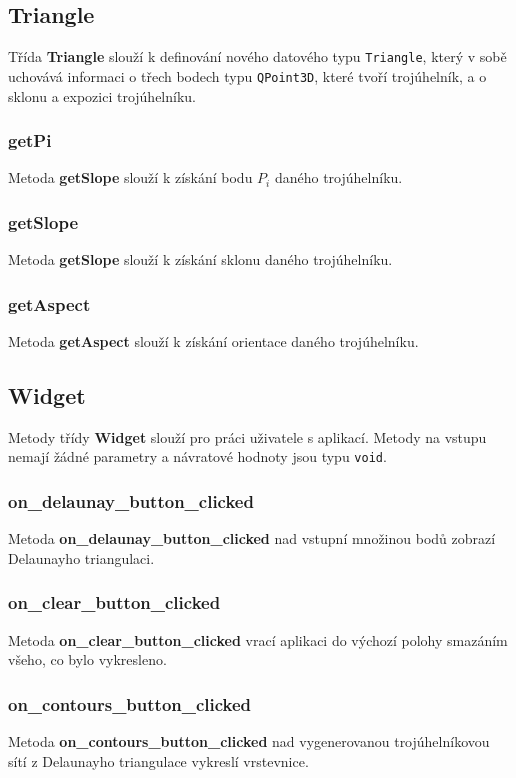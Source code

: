 \documentclass[a4paper, 12pt]{article}
\begin{document}
\subsection{Triangle}
Třída \textbf{Triangle} slouží k definování nového datového typu \texttt{Triangle}, který v sobě uchovává informaci o třech bodech typu \texttt{QPoint3D}, které tvoří trojúhelník, a o sklonu a expozici trojúhelníku.

\subsubsection*{getPi}
Metoda \textbf{getSlope} slouží k získání bodu $P_i$ daného trojúhelníku. 

\subsubsection*{getSlope}
Metoda \textbf{getSlope} slouží k získání sklonu daného trojúhelníku. 

\subsubsection*{getAspect}
Metoda \textbf{getAspect} slouží k získání orientace daného trojúhelníku. 


\subsection{Widget}
Metody třídy \textbf{Widget} slouží pro práci uživatele s aplikací. Metody na vstupu nemají žádné parametry a návratové hodnoty jsou typu \texttt{void}.

\subsubsection*{on\_delaunay\_button\_clicked}
Metoda \textbf{on\_delaunay\_button\_clicked} nad vstupní množinou bodů zobrazí Delaunayho triangulaci. 

\subsubsection*{on\_clear\_button\_clicked}
Metoda \textbf{on\_clear\_button\_clicked} vrací aplikaci do výchozí polohy smazáním všeho, co bylo vykresleno. 

\subsubsection*{on\_contours\_button\_clicked}
Metoda \textbf{on\_contours\_button\_clicked} nad vygenerovanou trojúhelníkovou sítí z Delaunayho triangulace vykreslí vrstevnice. 
\end{document}
